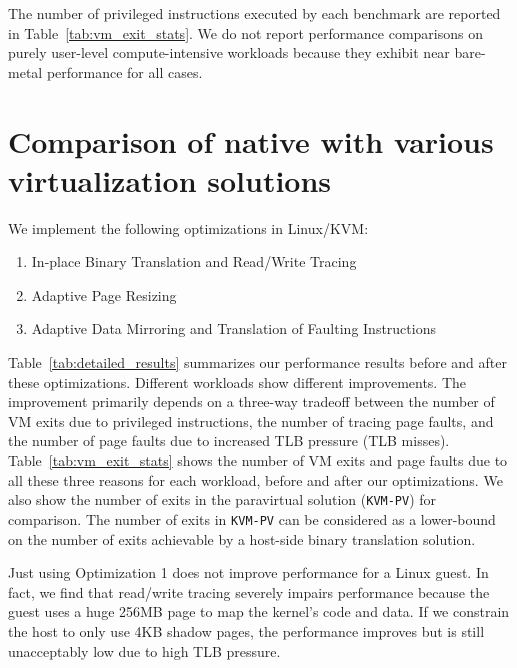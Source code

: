 The number of privileged instructions executed by each benchmark are reported in Table~\ref{tab:vm_exit_stats}. We do not report performance comparisons on purely user-level compute-intensive workloads because they exhibit near bare-metal performance for all cases.

\section{Comparison of native with various virtualization solutions}
We implement the following optimizations in Linux/KVM:
\begin{enumerate}
  \item In-place Binary Translation and Read/Write Tracing
  \item Adaptive Page Resizing
  \item Adaptive Data Mirroring and Translation of Faulting Instructions
\end{enumerate}
Table~\ref{tab:detailed_results} summarizes our performance results before and after these optimizations. Different workloads show different improvements. The improvement primarily depends on a three-way tradeoff between the number of VM exits due to privileged instructions, the number of tracing page faults, and the number of page faults due to increased TLB pressure (TLB misses). Table~\ref{tab:vm_exit_stats} shows the number of VM exits and page faults due to all these three reasons for each workload, before and after our optimizations. We also show the number of exits in the paravirtual solution ({\tt KVM-PV}) for comparison. The number of exits in {\tt KVM-PV} can be considered as a lower-bound on the number of exits achievable by a host-side binary translation solution.

Just using Optimization 1 does not improve performance for a Linux guest. In fact, we find that read/write tracing severely impairs performance because the guest uses a huge 256MB page to map the kernel's code and data. If we constrain the host to only use 4KB shadow pages, the performance improves but is still unacceptably low due to high TLB pressure.

